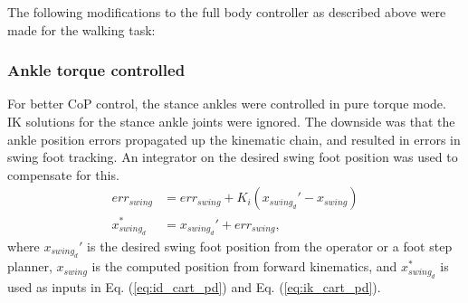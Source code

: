 \documentclass{ws-ijhr}
\newcommand{\eref}[1] {Eq. (\ref{#1})}
\begin{document}
The following modifications to the full body controller as described above were
made for the walking task:
\subsubsection{Ankle torque controlled}
For better CoP control, the stance ankles were controlled in pure torque mode. 
IK solutions for the stance ankle joints were ignored. 
The downside was that the ankle position errors propagated up the kinematic 
chain, and resulted in errors in swing foot tracking. 
An integrator on the desired swing foot position was used to compensate for this. 
\begin{equation}
  \label{eq:int}
  \begin{split}
    err_{swing} &= err_{swing} + K_i(x_{swing_d}' - x_{swing}) \\
    x_{swing_d}^* &= x_{swing_d}' + err_{swing},
  \end{split}
\end{equation}  
where $x_{swing_d}'$ is the desired swing foot position from the operator or a 
foot step planner, 
$x_{swing}$ is the computed position from forward kinematics, 
and $x_{swing_d}^*$ is used as inputs in \eref{eq:id_cart_pd} and 
\eref{eq:ik_cart_pd}. 
\end{document}
